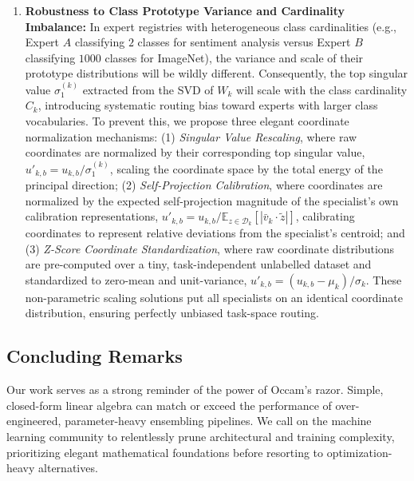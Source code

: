 \begin{enumerate}
    \item \textbf{Robustness to Class Prototype Variance and Cardinality Imbalance:} In expert registries with heterogeneous class cardinalities (e.g., Expert $A$ classifying $2$ classes for sentiment analysis versus Expert $B$ classifying $1000$ classes for ImageNet), the variance and scale of their prototype distributions will be wildly different. Consequently, the top singular value $\sigma_1^{(k)}$ extracted from the SVD of $W_k$ will scale with the class cardinality $C_k$, introducing systematic routing bias toward experts with larger class vocabularies. To prevent this, we propose three elegant coordinate normalization mechanisms: (1) \textit{Singular Value Rescaling}, where raw coordinates are normalized by their corresponding top singular value, $u'_{k,b} = u_{k,b} / \sigma_1^{(k)}$, scaling the coordinate space by the total energy of the principal direction; (2) \textit{Self-Projection Calibration}, where coordinates are normalized by the expected self-projection magnitude of the specialist's own calibration representations, $u'_{k,b} = u_{k,b} / \mathbb{E}_{z \in \mathcal{D}_k}[|\bar{v}_k \cdot \tilde{z}|]$, calibrating coordinates to represent relative deviations from the specialist's centroid; and (3) \textit{Z-Score Coordinate Standardization}, where raw coordinate distributions are pre-computed over a tiny, task-independent unlabelled dataset and standardized to zero-mean and unit-variance, $u'_{k,b} = (u_{k,b} - \mu_k) / \sigma_k$. These non-parametric scaling solutions put all specialists on an identical coordinate distribution, ensuring perfectly unbiased task-space routing.
\end{enumerate}

\subsection{Concluding Remarks}
Our work serves as a strong reminder of the power of Occam's razor. Simple, closed-form linear algebra can match or exceed the performance of over-engineered, parameter-heavy ensembling pipelines. We call on the machine learning community to relentlessly prune architectural and training complexity, prioritizing elegant mathematical foundations before resorting to optimization-heavy alternatives.
